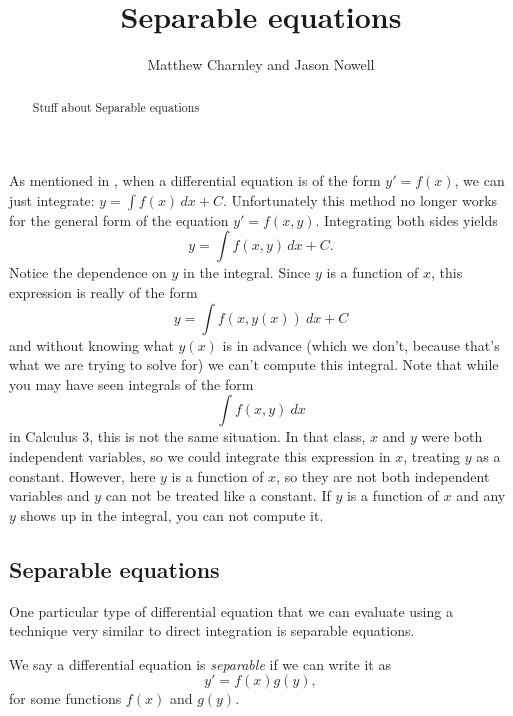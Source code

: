 \documentclass{ximera}
\title{Separable equations}
\author{Matthew Charnley and Jason Nowell}
\begin{document}
\begin{abstract}
    Stuff about Separable equations
\end{abstract}
\maketitle

\label{separable:section}



As mentioned in , when a differential equation is of the form $y' = f(x)$, we can just integrate: $y = \int f(x) \,dx + C$. Unfortunately this method no longer works for the general form of the equation $y' = f(x,y)$. Integrating both sides yields 
\begin{equation*}
    y = \int f(x,y) \,dx + C .
\end{equation*}
Notice the dependence on $y$ in the integral. Since $y$ is a function of $x$, this expression is really of the form
\begin{equation*}
    y = \int f(x, y(x))\ dx + C
\end{equation*}
and without knowing what $y(x)$ is in advance (which we don't, because that's what we are trying to solve for) we can't compute this integral. Note that while you may have seen integrals of the form 
\begin{equation*}
    \int f(x,y)\ dx 
\end{equation*} 
in Calculus 3, this is not the same situation. In that class, $x$ and $y$ were both independent variables, so we could integrate this expression in $x$, treating $y$ as a constant. However, here $y$ is a function of $x$, so they are not both independent variables and $y$ can not be treated like a constant. If $y$ is a function of $x$ and any $y$ shows up in the integral, you can not compute it. 

\subsection{Separable equations}

One particular type of differential equation that we can evaluate using a technique very similar to direct integration is separable equations. 
\begin{definition}
    We say a differential equation is \emph{separable} if we can write it as
    \begin{equation*}
        y' = f(x)g(y) ,
    \end{equation*}
    for some functions $f(x)$ and $g(y)$.
\end{definition}
\end{document}
